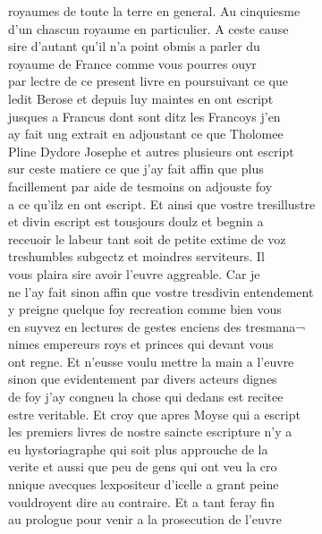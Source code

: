 \documentclass[12pt]{article}
\begin{document}
\newpage
royaumes de toute la terre en general. Au
            cinquiesme\\
d'un chascun royaume en particulier. A ceste cause\\
sire
          d'autant qu'il n'a point obmis a parler du\\
royaume de France comme vous pourres
            ouyr\\
par lectre de ce present livre en poursuivant ce que\\
ledit
            Berose et depuis luy maintes en ont escript\\
jusques a Francus dont sont ditz les
          Francoys j'en\\
ay fait ung extrait en adjoustant ce que Tholomee\\
 Pline Dydore Josephe et autres plusieurs ont escript\\
sur ceste matiere ce que j'ay fait affin que plus\\
facillement par
          aide de tesmoins on adjouste foy\\
a ce qu'ilz en ont escript. Et ainsi que
          vostre tresillustre\\
et divin escript est tousjours doulz et begnin a\\
receuoir le labeur tant soit de petite extime de voz\\
treshumbles subgectz et
          moindres serviteurs. Il\\
vous plaira sire avoir l'euvre aggreable. Car je\\
ne l'ay fait sinon affin que vostre tresdivin entendement\\
y preigne
          quelque foy recreation comme bien vous\\
en suyvez en lectures de gestes enciens
          des tresmana¬\\
nimes empereurs roys et princes qui devant vous\\
ont
          regne. Et n'eusse voulu mettre la main a l'euvre\\
sinon que evidentement par
          divers acteurs dignes\\
de foy j'ay congneu la chose qui dedans est recitee\\
estre veritable. Et croy que apres Moyse qui a
            escript\\
les premiers livres de nostre saincte
            escripture n'y a\\
eu hystoriagraphe qui soit plus approuche de la\\
verite et aussi que peu de gens qui ont veu la cro\\
nnique avecques lexpositeur
            d'icelle a grant peine\\
vouldroyent dire au contraire. Et a tant feray
            fin\\
au prologue pour venir a la prosecution de l'euvre
\end{document}
